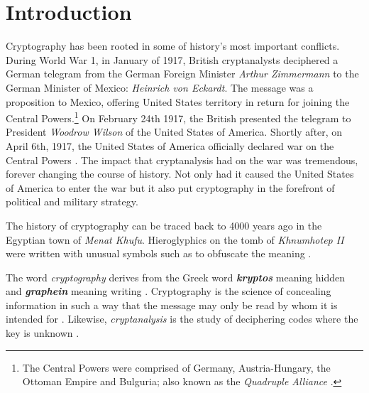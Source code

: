 \chapter{Introduction} %
\label{Introduction} %


\newcommand{\keyword}[1]{\textbf{#1}}
\newcommand{\tabhead}[1]{\textbf{#1}}
\newcommand{\code}[1]{\texttt{#1}}
\newcommand{\file}[1]{\texttt{\bfseries#1}}
\newcommand{\option}[1]{\texttt{\itshape#1}}


Cryptography has been rooted in some of history's most important conflicts. 
During World War 1, in January of 1917, British cryptanalysts deciphered a German
telegram from the German Foreign Minister \textit{Arthur Zimmermann} to the German Minister
of Mexico: \textit{Heinrich von Eckardt}. The message was a proposition to Mexico, offering
United States territory in return for joining the Central Powers.\footnote{The Central Powers 
were comprised of Germany, Austria-Hungary, the Ottoman Empire and Bulguria; also known as
the \textit{Quadruple Alliance} \cite{wiki:central_powers}.} On February 24th 1917, the British
presented the telegram to President \textit{Woodrow Wilson} of the United States of America. 
Shortly after, on April 6th, 1917, the United States of America officially declared war
on the Central Powers \cite{the_zimmermann_telegram}. The impact that cryptanalysis had on
the war was tremendous, forever changing the course of history. Not only had it caused the
United States of America to enter the war but it also put cryptography in the forefront of political
and military strategy. 

The history of cryptography can be traced back to 4000 years ago in the Egyptian town of 
\textit{Menat Khufu}. Hieroglyphics on the tomb of \textit{Khnumhotep II} were written with unusual 
symbols such as to obfuscate the meaning \cite{history_of_cryptography}. 

The word \textit{cryptography} derives from the Greek word \textbf{\textit{kryptos}}
meaning hidden and \textbf{\textit{graphein}} meaning writing \cite{pawlan_cryptography}.
Cryptography is the science of concealing information in such a way that the message
may only be read by whom it is intended for \cite{cryptography_definition}. 
Likewise, \textit{cryptanalysis} is the study of deciphering codes where the key is unknown 
\cite{cryptanalysis_definition}.  

